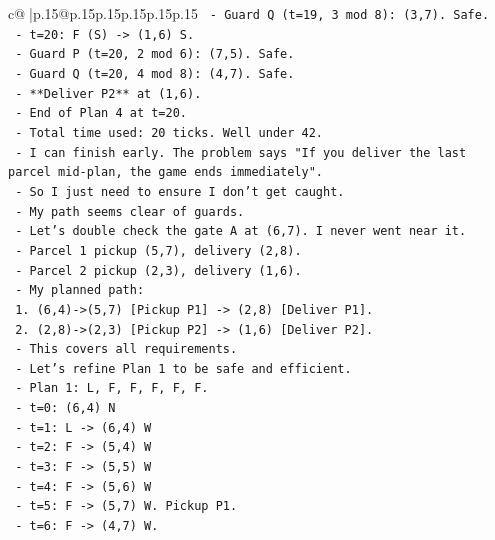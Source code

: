 \documentclass{article}
\begin{document}
{\begin{supertabular}{c@{$\;$}|p{.15\linewidth}@{}p{.15\linewidth}p{.15\linewidth}p{.15\linewidth}p{.15\linewidth}p{.15\linewidth}}
{{{\texttt{            {-} Guard Q (t=19, 3 mod 8): (3,7). Safe.} \\
\texttt{          {-} t=20: F (S) {-}> (1,6) S.} \\
\texttt{            {-} Guard P (t=20, 2 mod 6): (7,5). Safe.} \\
\texttt{            {-} Guard Q (t=20, 4 mod 8): (4,7). Safe.} \\
\texttt{            {-} **Deliver P2** at (1,6).} \\
\texttt{          {-} End of Plan 4 at t=20.} \\
\texttt{          {-} Total time used: 20 ticks. Well under 42.} \\
\texttt{          {-} I can finish early. The problem says "If you deliver the last parcel mid{-}plan, the game ends immediately".} \\
\texttt{          {-} So I just need to ensure I don't get caught.} \\
\texttt{          {-} My path seems clear of guards.} \\
\texttt{          {-} Let's double check the gate A at (6,7). I never went near it.} \\
\texttt{          {-} Parcel 1 pickup (5,7), delivery (2,8).} \\
\texttt{          {-} Parcel 2 pickup (2,3), delivery (1,6).} \\
\texttt{          {-} My planned path:} \\
\texttt{            1. (6,4){-}>(5,7) {[}Pickup P1{]} {-}> (2,8) {[}Deliver P1{]}.} \\
\texttt{            2. (2,8){-}>(2,3) {[}Pickup P2{]} {-}> (1,6) {[}Deliver P2{]}.} \\
\texttt{          {-} This covers all requirements.} \\
\texttt{          {-} Let's refine Plan 1 to be safe and efficient.} \\
\texttt{          {-} Plan 1: L, F, F, F, F, F.} \\
\texttt{            {-} t=0: (6,4) N} \\
\texttt{            {-} t=1: L {-}> (6,4) W} \\
\texttt{            {-} t=2: F {-}> (5,4) W} \\
\texttt{            {-} t=3: F {-}> (5,5) W} \\
\texttt{            {-} t=4: F {-}> (5,6) W} \\
\texttt{            {-} t=5: F {-}> (5,7) W. Pickup P1.} \\
\texttt{            {-} t=6: F {-}> (4,7) W.} \\
}}}
\end{supertabular}}
\end{document}

